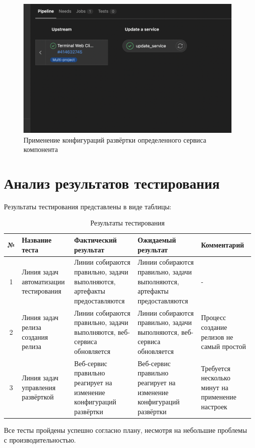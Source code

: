 \begin{enumerate}
    \begin{figure}[ht]
        \centering
        \includegraphics[scale=0.6]{src/figures/5}
        \caption{Применение конфигураций развёртки определенного сервиса компонента}
        \label{fig:qa-deploy-service}
    \end{figure}
\end{enumerate}

\section{Анализ результатов тестирования}

Результаты тестирования представлены в виде таблицы:

\begin{center}
    \begin{longtable}{|c|p{}|p{}|p{}|p{}|}
        \caption{Результаты тестирования}
        \label{tab:testing-res}
        \hline
        № & Название теста & Фактический результат & Ожидаемый результат & Комментарий                                                   \\
        \hline
        1 & Линия задач автоматизации тестирования  & Линии собираются правильно, задачи выполняются, артефакты предоставляются & Линии собираются правильно, задачи выполняются, артефакты предоставляются & - \\
        \hline
        2 & Линия задач релиза создания релиза  & Линии собираются правильно, задачи выполняются, веб-сервиса обновляется & Линии собираются правильно, задачи выполняются, веб-сервиса обновляется & Процесс создание релизов не самый простой  \\
        \hline
        3 & Линия задач управления развёрткой  & Веб-сервис правильно реагирует на изменение конфигураций развёртки & Веб-сервис правильно реагирует на изменение конфигураций развёртки & Требуется несколько минут на применение настроек \\
        \hline
    \end{longtable}
\end{center}

Все тесты пройдены успешно согласно плану, несмотря на небольшие проблемы с производительностью.

